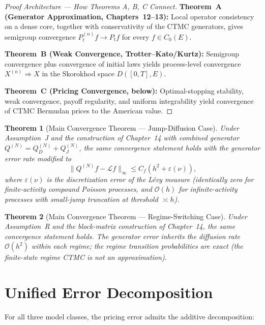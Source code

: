 \documentclass[11pt,a4paper,openany]{book}
\theoremstyle{definition}
\theoremstyle{plain}
\newtheorem{theorem}{Theorem}[chapter]
\theoremstyle{remark}
\newcommand{\1}{\mathbbm{1}}
\begin{document}
\begin{proof}[Proof Architecture --- How Theorems A, B, C Connect]
\textbf{Theorem~A (Generator Approximation, Chapters~12--13):} Local operator consistency on a dense core, together with conservativity of the CTMC generators, gives semigroup convergence $P_t^{(n)} f \to P_t f$ for every $f \in C_0(E)$.

\textbf{Theorem~B (Weak Convergence, Trotter--Kato/Kurtz):} Semigroup convergence plus convergence of initial laws yields process-level convergence $X^{(n)} \Rightarrow X$ in the Skorokhod space $D([0,T],E)$.

\textbf{Theorem~C (Pricing Convergence, below):} Optimal-stopping stability, weak convergence, payoff regularity, and uniform integrability yield convergence of CTMC Bermudan prices to the American value.
\end{proof}

\begin{theorem}[Main Convergence Theorem --- Jump-Diffusion Case]
Under Assumption~J and the construction of Chapter~14 with combined generator $Q^{(N)} = Q_{D}^{(N)} + Q_{J}^{(N)}$, the same convergence statement holds with the generator error rate modified to
\[
\|Q^{(N)} f - \mathcal{L} f\|_{\infty} \leq C_{f} (h^{2} + \varepsilon(\nu)),
\]
where $\varepsilon(\nu)$ is the discretization error of the L\'{e}vy measure (identically zero for finite-activity compound Poisson processes, and $\mathcal{O}(h)$ for infinite-activity processes with small-jump truncation at threshold $\asymp h$).
\end{theorem}

\begin{theorem}[Main Convergence Theorem --- Regime-Switching Case]
Under Assumption~R and the block-matrix construction of Chapter~14, the same convergence statement holds. The generator error inherits the diffusion rate $\mathcal{O}(h^{2})$ within each regime; the regime transition probabilities are exact (the finite-state regime CTMC is not an approximation).
\end{theorem}

\section{Unified Error Decomposition}

For all three model classes, the pricing error admits the additive decomposition:
\end{document}
